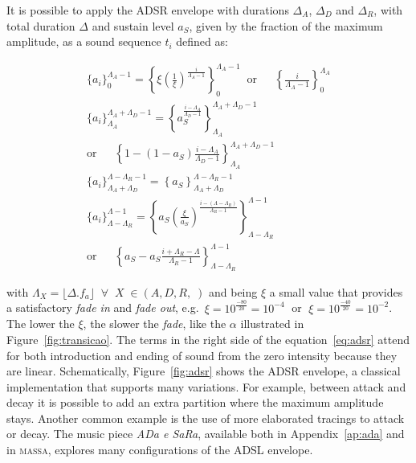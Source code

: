\documentclass[
 aip,
 jmp,
 amsmath,amssymb,
 reprint,
]{revtex4-1}
\newcommand{\massa}{{\large \textsc{massa}}}
\begin{document}
It is possible to apply the ADSR envelope with durations $\Delta_A$, $\Delta_D$ and $\Delta_R$, with total duration $\Delta$ and sustain level $a_S$, given by the fraction of the maximum amplitude, as a sound sequence $t_i$ defined as:

\begin{multline}\label{eq:adsr}
\{a_i\}_0^{\Lambda_A-1}  = \left\{\xi\left(\frac{1}{\xi}\right)^{\frac{i}{\Lambda_A-1}}\right\}_0^{\Lambda_A-1} \;\; \text{or} \;\;\quad \left\{\frac{i}{\Lambda_A-1}\right\}_0^{\Lambda_A}\\
\{a_i\}_{\Lambda_A}^{\Lambda_A+\Lambda_D-1} =\left\{a_S^{\frac{i-\Lambda_A}{\Lambda_D-1}}  \right\}_{\Lambda_A}^{\Lambda_A+\Lambda_D-1} \;\;\quad \quad\quad \\ \text{or} \quad\;\; \left\{1-(1-a_S)\frac{i-\Lambda_A}{\Lambda_D-1}\right\}_{\Lambda_A}^{\Lambda_A+\Lambda_D-1}\\
\{ a_i \}_{\Lambda_A+\Lambda_D}^{\Lambda-\Lambda_R-1} =\left\{ a_S \right\}_{\Lambda_A+\Lambda_D}^{\Lambda-\Lambda_R-1} \\
\{ a_i \}_{\Lambda-\Lambda_R}^{\Lambda-1}  =\left\{ a_S\left(\frac{\xi}{a_S} \right)^{\frac{i-(\Lambda-\Lambda_R)}{\Lambda_R-1}} \right\}_{\Lambda-\Lambda_R}^{\Lambda-1} \quad\;\; \\ \text{or} \quad\;\; \left\{ a_S - a_S\frac{i+\Lambda_R-\Lambda}{\Lambda_R-1}\right\}_{\Lambda-\Lambda_R}^{\Lambda-1} 
\end{multline}


\noindent with $\Lambda_X=\lfloor \Delta . f_a \rfloor\;\;\forall\;\; X \; \in
(A,D,R,\;)$ and being $\xi$ a small value that provides a satisfactory \emph{fade in} and \emph{fade out}, e.g.\ $\xi=10^{\frac{-80}{20}}=10^{-4}\;$ or $\;\xi=10^{\frac{-40}{20}}=10^{-2}$. The lower the $\xi$, the slower the \emph{fade}, like the $\alpha$ illustrated in Figure~\ref{fig:transicao}. The terms in the right side of the equation~\ref{eq:adsr} attend for both introduction and ending of sound from the zero intensity because they are linear. Schematically, Figure~\ref{fig:adsr} shows the ADSR envelope, a classical implementation that supports many variations. For example, between attack and decay it is possible to add an extra partition where the maximum amplitude stays. Another common example is the use of more elaborated tracings to attack or decay. The music piece \emph{ADa e SaRa}, available both in
Appendix~\ref{ap:ada} and in \massa, explores many configurations of the ADSL envelope.
\end{document}

